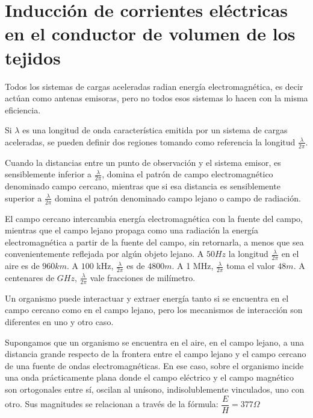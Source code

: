 \section{Inducción de corrientes eléctricas en el conductor de volumen de los tejidos}

Todos los sistemas de cargas aceleradas radian energía electromagnética, es decir actúan como antenas emisoras, pero no todos esos sistemas lo hacen con la misma eficiencia.

Si $\lambda$ es una longitud de onda característica emitida por un sistema de cargas aceleradas, se pueden definir dos regiones tomando como referencia la longitud $\frac{\lambda}{2\pi}$.

Cuando la distancias entre un punto de observación y el sistema emisor, es sensiblemente inferior a $\frac{\lambda}{2\pi}$, domina el patrón de campo electromagnético denominado campo cercano, mientras que si esa distancia es sensiblemente superior a $\frac{\lambda}{2\pi}$ domina el patrón denominado campo lejano o campo de radiación.

El campo cercano intercambia energía electromagnética con la fuente del campo, mientras que el campo lejano propaga como una radiación la energía electromagnética a partir de la fuente del campo, sin retornarla, a menos que sea convenientemente reflejada por algún objeto lejano.
A $50 Hz$ la longitud $\frac{\lambda}{2\pi}$ en el aire es de $960 km$. A $100$ kHz, $\frac{\lambda}{2\pi}$ es de $4800 m$. A 1 MHz, $\frac{\lambda}{2\pi}$ toma el valor $48 m$. A centenares de $GHz$, $\frac{\lambda}{2\pi}$ vale fracciones de milímetro.



Un organismo puede interactuar y extraer energía tanto si se encuentra en el campo cercano como en el campo lejano, pero los mecanismos de interacción son diferentes en uno y otro caso.

Supongamos que un organismo se encuentra en el aire, en el campo lejano, a una distancia grande respecto de la frontera entre el campo lejano y el campo cercano de una fuente de ondas electromagnéticas. En ese caso, sobre el organismo incide una onda prácticamente plana donde el campo eléctrico y el campo magnético son ortogonales entre sí, oscilan al unísono, indisolublemente vinculados, uno con otro. Sus magnitudes se relacionan a través de la fórmula: $\dfrac{E}{H}=377\Omega$

